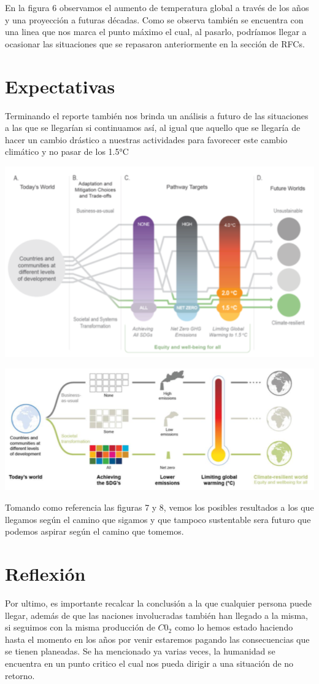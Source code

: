 \documentclass[6pt, spanish]{report}
\begin{document}
En la figura 6 observamos el aumento de temperatura global a través de los años y una proyección a futuras décadas.
Como se observa también se encuentra con una linea que nos marca el punto máximo el cual, al pasarlo, podríamos llegar a ocasionar las situaciones que se repasaron anteriormente en la sección de RFCs. 



\section*{Expectativas}

Terminando el reporte también nos brinda un análisis a futuro de las situaciones a las que se llegarían si continuamos así, al igual que aquello que se llegaría de hacer un cambio drástico a nuestras actividades para favorecer este cambio climático y no pasar de los 1.5°C



\begin{center}\vspace{.2cm}
\includegraphics[width=.2\linewidth]{Grafica7.png}
\end{center}\vspace{.2cm}






\begin{center}\vspace{.2cm}
\includegraphics[width=.2\linewidth]{Grafica8.png}
\end{center}\vspace{.2cm}

Tomando como referencia las figuras 7 y 8, vemos los posibles resultados a los que llegamos según el camino que sigamos y que tampoco sustentable sera futuro que podemos aspirar según el camino que tomemos.

 
\section*{Reflexión}
Por ultimo, es importante recalcar la conclusión a la que cualquier persona puede llegar, además de que las naciones involucradas también han llegado a la misma, si seguimos con la misma producción de $C0_2$ como lo hemos estado haciendo hasta el momento en los años por venir estaremos pagando las consecuencias que se tienen planeadas. 
Se ha mencionado ya varias veces, la humanidad se encuentra en un punto critico el cual nos pueda dirigir a una situación de no retorno. 
\end{document}
